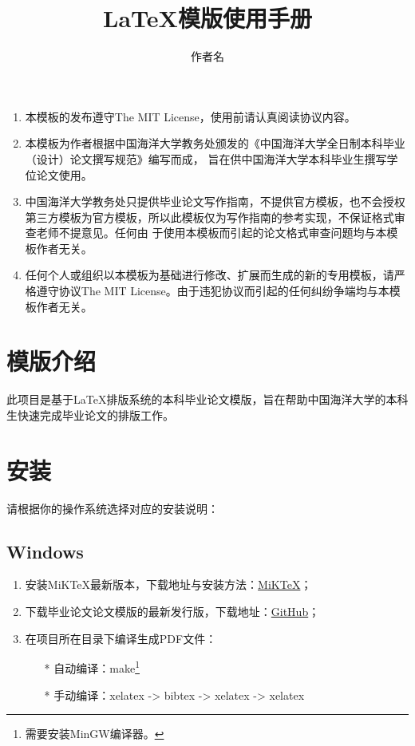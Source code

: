 \documentclass[zihao = -4,cn]{oucart}
\title{\textcolor[rgb]{0,0.19607843,0.7372549}\LaTeX{}模版使用手册}
\author{作者名}
\begin{document}
\makecover

\thispagestyle{empty}
\vspace{40mm}
\begin{center}
\heiti{}
\end{center}

\begin{enumerate}
\item 本模板的发布遵守The MIT License，使用前请认真阅读协议内容。
\item 本模板为作者根据中国海洋大学教务处颁发的《中国海洋大学全日制本科毕业（设计）论文撰写规范》编写而成， 旨在供中国海洋大学本科毕业生撰写学位论文使用。
\item 中国海洋大学教务处只提供毕业论文写作指南，不提供官方模板，也不会授权第三方模板为官方模板，所以此模板仅为写作指南的参考实现，不保证格式审查老师不提意见。任何由 于使用本模板而引起的论文格式审查问题均与本模板作者无关。
\item 任何个人或组织以本模板为基础进行修改、扩展而生成的新的专用模板，请严格遵守协议The MIT License。由于违犯协议而引起的任何纠纷争端均与本模板作者无关。
\end{enumerate}
\newpage

\makeabstract

\thispagestyle{tableofcontents}  
\tableofcontents

\newpage
{}
\setcounter{page}{1} 
\section{模版介绍}
此项目是基于\LaTeX{}排版系统的本科毕业论文模版，旨在帮助中国海洋大学的本科生快速完成毕业论文的排版工作。
\section{安装}
请根据你的操作系统选择对应的安装说明：
\subsection{Windows}
\begin{enumerate}
	\item 安装MiKTeX最新版本，下载地址与安装方法：\href{https://miktex.org/howto/install-miktex}{MiKTeX}；
	\item 下载毕业论文论文模版的最新发行版，下载地址：\href{https://github.com/OSOUC/UndergraduateThesisLaTeXTemplate/releases}{GitHub}；
	\item 在项目所在目录下编译生成PDF文件：
	\begin{itemize}
		\item[*]  自动编译：make\footnote{需要安装MinGW编译器。}
		\item[*]  手动编译：xelatex -> bibtex -> xelatex -> xelatex
	\end{itemize}
\end{enumerate}
\end{document}
